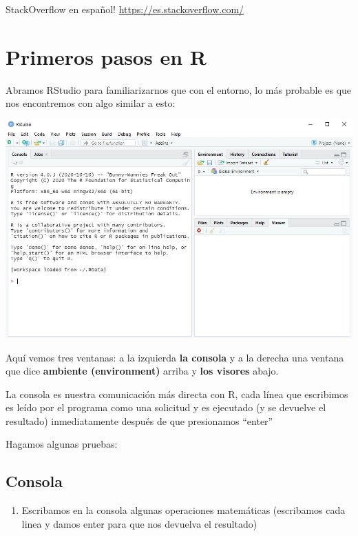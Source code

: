 \documentclass[
]{book}
\providecommand{\tightlist}{%
  \setlength{\itemsep}{0pt}\setlength{\parskip}{0pt}}
\begin{document}
StackOverflow en español! \url{https://es.stackoverflow.com/}

\hypertarget{primeros-pasos-en-r}{%
\chapter{Primeros pasos en R}\label{primeros-pasos-en-r}}

Abramos RStudio para familiarizarnos que con el entorno, lo más probable es que nos encontremos con algo similar a esto:

\includegraphics[width=12.96in]{img/Rstudiofig1}

Aquí vemos tres ventanas: a la izquierda \textbf{la consola} y a la derecha una ventana que dice \textbf{ambiente (environment)} arriba y \textbf{los visores} abajo.

La consola es nuestra comunicación más directa con R, cada línea que escribimos es leído por el programa como una solicitud y es ejecutado (y se devuelve el resultado) inmediatamente después de que presionamos ``enter''

Hagamos algunas pruebas:

\hypertarget{consola}{%
\section{Consola}\label{consola}}

\begin{enumerate}
\def\labelenumi{\arabic{enumi}.}
\tightlist
\item
  Escribamos en la consola algunas operaciones matemáticas (escribamos cada linea y damos enter para que nos devuelva el resultado)
\end{enumerate}
\end{document}
